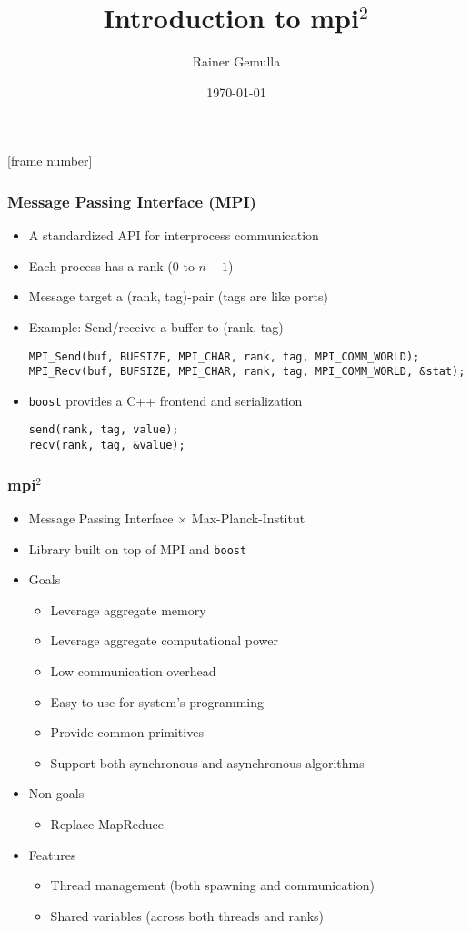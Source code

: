 \documentclass[t,fleqn]{beamer}
\title{Introduction to mpi$^2$}
\author{Rainer Gemulla}
\date{\today}
\begin{document}
\frame{\titlepage}
[frame number]

\begin{frame}[fragile]\frametitle{Message Passing Interface (MPI)}  
  \begin{itemize}
  \item A standardized API for interprocess communication
  \item Each process has a rank ($0$ to $n-1$)  
  \item Message target a (rank, tag)-pair (tags are like ports)
  \item Example: Send/receive a buffer to (rank, tag)
    \begin{lstlisting}
MPI_Send(buf, BUFSIZE, MPI_CHAR, rank, tag, MPI_COMM_WORLD);
MPI_Recv(buf, BUFSIZE, MPI_CHAR, rank, tag, MPI_COMM_WORLD, &stat);
    \end{lstlisting}
  \item \texttt{boost} provides a C++ frontend and serialization
    \begin{lstlisting}
send(rank, tag, value);      
recv(rank, tag, &value);
    \end{lstlisting}
  \end{itemize}
\end{frame}

\begin{frame}\frametitle{mpi$^2$}
  \begin{itemize}
  \item Message Passing Interface $\times$ Max-Planck-Institut
  \item Library built on top of MPI and \texttt{boost}
  \item Goals
    \begin{itemize}
    \item Leverage aggregate memory
    \item Leverage aggregate computational power
    \item Low communication overhead
    \item Easy to use for system's programming
    \item Provide common primitives
    \item Support both synchronous and asynchronous algorithms
    \end{itemize}
  \item Non-goals
    \begin{itemize}
    \item Replace MapReduce
    \end{itemize}
  \item Features
    \begin{itemize}
    \item Thread management (both spawning and communication)
    \item Shared variables (across both threads and ranks)
    \end{itemize}
  \end{itemize}
\end{frame}
\end{document}
